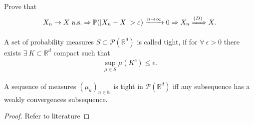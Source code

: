 \begin{exercise}
 Prove that 
 \begin{align*}
   X_n \to  X \ \text{a.s.} \Rightarrow \mathbb{P}(\lvert X_n - X\rvert > \varepsilon ) \xrightarrow{n\to \infty} 0 \Rightarrow X_n \xRightarrow{(D)} X
 .\end{align*}
\end{exercise}
\begin{definition}[Tightness]
 A set of probability measures $S \subset  \mathcal{P}(\mathbb{R}^{d} )$  is called tight, if 
 for $\forall \ \epsilon  > 0$ there exists $\exists \  K \subset  \mathbb{R}^{d} $ compact such that 
 \begin{align*}
   \sup_{\mu  \in  S} \mu(K^{c} )  \le  \epsilon 
 .\end{align*}
\end{definition}
\begin{theorem}
  A sequence of measures $(\mu_n)_{n \in  \mathbb{N}}$  is tight in $\mathcal{P}(\mathbb{R}^{d} )$ iff 
  any subsequence has a weakly convergences subsequence.
\end{theorem}
\begin{proof}
 Refer to literature 
\end{proof}
